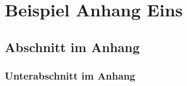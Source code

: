 
\chapter{Beispiel Anhang Eins}
\label{chp:Beispiel_Anhang_Eins}

\blindtext

\section{Abschnitt im Anhang}

\subsection{Unterabschnitt im Anhang}

\blindtext